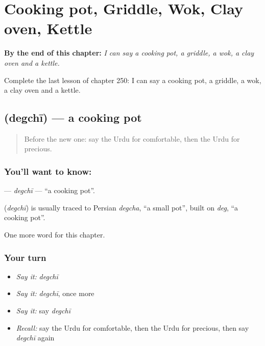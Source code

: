 
\chapter{Cooking pot, Griddle, Wok, Clay oven, Kettle}
\label{ch:ur-cooking-pot-griddle-wok-clay-oven-kettle}

\begin{chapteropening}
\textbf{By the end of this chapter:} \emph{I can say a cooking pot, a griddle, a wok, a clay oven and a kettle.}

Complete the last lesson of chapter 250: I can say a cooking pot, a griddle, a wok, a clay oven and a kettle.
\end{chapteropening}

\section[\texorpdfstring{\ur{دیگچی} (degchī)}{دیگچی (degchī)}]{ (degchī) — a cooking pot}

\label{lesson:UR-C250-degchi}



\begin{quote}
Before the new one: say the Urdu for comfortable, then the Urdu for precious.
\end{quote}

\subsection*{You'll want to know: }
\textbf{} — \emph{degchī} — \textquotedblleft{}a cooking pot\textquotedblright{}.

\begin{cousinweb}
\textbf{} (\emph{degchī}) is usually traced to Persian \emph{degcha}, \textquotedblleft{}a small pot\textquotedblright{}, built on \emph{deg}, \textquotedblleft{}a cooking pot\textquotedblright{}.
\end{cousinweb}

\begin{grammarlens}[title={What you've built}]
One more word for this chapter.
\end{grammarlens}

\subsection*{Your turn}
\begin{itemize}
\raggedright
  \item \emph{Say it:} \emph{degchī}
  \item \emph{Say it:} \emph{degchī}, once more
  \item \emph{Say it:} say \emph{degchī}
  \item \emph{Recall:} say the Urdu for comfortable, then the Urdu for precious, then say \emph{degchī} again
\end{itemize}

